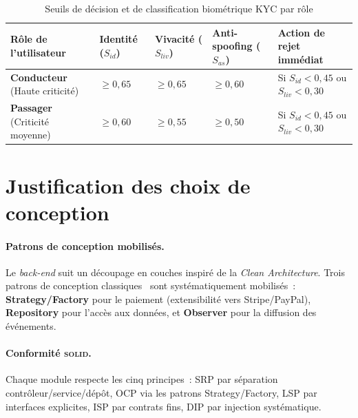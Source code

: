 \begin{table}[H]
\centering
\small
\renewcommand{\arraystretch}{1.3}
\begin{tabularx}{\textwidth}{|>{\hsize=1.25\hsize}X|>{\centering\arraybackslash\hsize=0.85\hsize}X|>{\centering\arraybackslash\hsize=0.85\hsize}X|>{\centering\arraybackslash\hsize=0.9\hsize}X|>{\hsize=1.15\hsize\arraybackslash}X|}
\hline
\rowcolor{rohlight}
\textbf{Rôle de l'utilisateur} & \textbf{Identité ($S_{id}$)} & \textbf{Vivacité ($S_{liv}$)} & \textbf{Anti-spoofing ($S_{as}$)} & \textbf{Action de rejet immédiat} \\
\hline
\textbf{Conducteur} (Haute criticité) & $\geq 0{,}65$ & $\geq 0{,}65$ & $\geq 0{,}60$ & Si $S_{id} < 0{,}45$ ou $S_{liv} < 0{,}30$ \\
\hline
\textbf{Passager} (Criticité moyenne) & $\geq 0{,}60$ & $\geq 0{,}55$ & $\geq 0{,}50$ & Si $S_{id} < 0{,}45$ ou $S_{liv} < 0{,}30$ \\
\hline
\end{tabularx}
\caption{Seuils de décision et de classification biométrique KYC par rôle}
\label{tab:seuils-biometriques}
\end{table}

\clearpage
\section{Justification des choix de conception}
\label{sec:justification}

\paragraph{Patrons de conception mobilisés.} Le \textit{back-end} suit un découpage en couches inspiré de la \textit{Clean Architecture}. Trois patrons de conception classiques~\cite{gof_design_patterns_1994} sont systématiquement mobilisés~: \textbf{Strategy/Factory} pour le paiement (extensibilité vers Stripe/PayPal), \textbf{Repository} pour l'accès aux données, et \textbf{Observer} pour la diffusion des événements.

\paragraph{Conformité \textsc{solid}.} Chaque module respecte les cinq principes~: SRP par séparation contrôleur/service/dépôt, OCP via les patrons Strategy/Factory, LSP par interfaces explicites, ISP par contrats fins, DIP par injection systématique.

